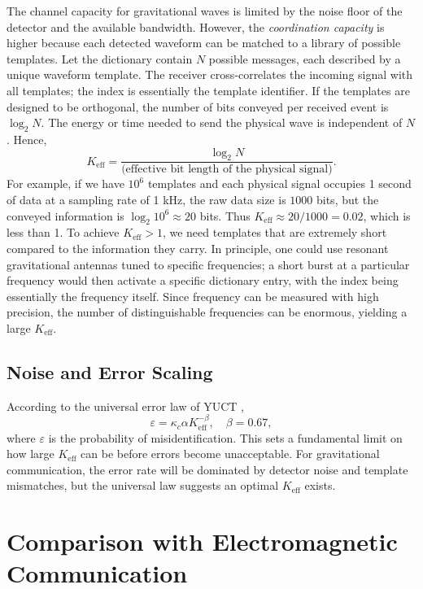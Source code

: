 \documentclass[12pt,a4paper]{article}
\newcommand{\Keff}{K_{\mathrm{eff}}}
\newcommand{\kappac}{\kappa_c}
\newcommand{\eps}{\varepsilon}
\begin{document}
	The channel capacity for gravitational waves is limited by the noise floor of the detector and the available bandwidth. However, the \emph{coordination capacity} is higher because each detected waveform can be matched to a library of possible templates. Let the dictionary contain \(N\) possible messages, each described by a unique waveform template. The receiver cross‑correlates the incoming signal with all templates; the index is essentially the template identifier. If the templates are designed to be orthogonal, the number of bits conveyed per received event is \(\log_2 N\). The energy or time needed to send the physical wave is independent of \(N\). Hence,
	\begin{equation}
		\Keff = \frac{\log_2 N}{\text{(effective bit length of the physical signal)}}.
	\end{equation}
	For example, if we have \(10^6\) templates and each physical signal occupies 1 second of data at a sampling rate of 1 kHz, the raw data size is \(1000\) bits, but the conveyed information is \(\log_2 10^6 \approx 20\) bits. Thus \(\Keff \approx 20/1000 = 0.02\), which is less than 1. To achieve \(\Keff > 1\), we need templates that are extremely short compared to the information they carry. In principle, one could use resonant gravitational antennas tuned to specific frequencies; a short burst at a particular frequency would then activate a specific dictionary entry, with the index being essentially the frequency itself. Since frequency can be measured with high precision, the number of distinguishable frequencies can be enormous, yielding a large \(\Keff\).
	
	\subsection{Noise and Error Scaling}
	
	According to the universal error law of YUCT \cite{AppendixL},
	\begin{equation}
		\eps = \kappac \alpha \Keff^{-\beta}, \quad \beta = 0.67,
		\label{eq:universal-scaling}
	\end{equation}
	where \(\eps\) is the probability of misidentification. This sets a fundamental limit on how large \(\Keff\) can be before errors become unacceptable. For gravitational communication, the error rate will be dominated by detector noise and template mismatches, but the universal law suggests an optimal \(\Keff\) exists.
	
	\section{Comparison with Electromagnetic Communication}
	\label{sec:comparison}
	
\end{document}
